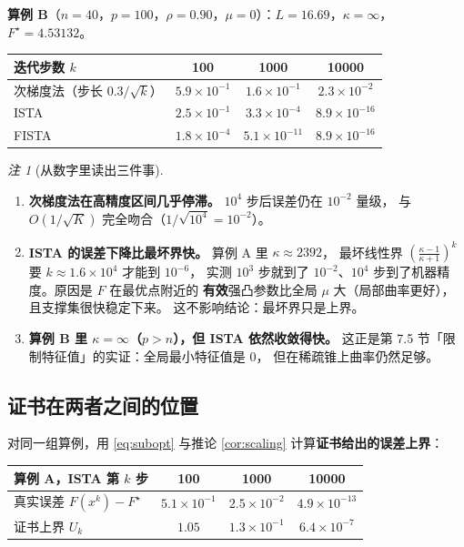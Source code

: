 \documentclass[11pt,a4paper,UTF8]{ctexart}
\theoremstyle{plain}
\theoremstyle{definition}
\theoremstyle{remark}
\newtheorem{remark}[theorem]{注}
\begin{document}
\textbf{算例 B}（$n=40$，$p=100$，$\rho=0.90$，$\mu=0$）：$L=16.69$，$\kappa=\infty$，
$F^\star=4.53132$。

\begin{center}
\small
\begin{tabular}{@{}lccc@{}}
\toprule
迭代步数 $k$ & 100 & 1000 & 10000\\
\midrule
次梯度法（步长 $0.3/\sqrt k$）& $5.9\times10^{-1}$ & $1.6\times10^{-1}$ & $2.3\times10^{-2}$\\
ISTA & $2.5\times10^{-1}$ & $3.3\times10^{-4}$ & $8.9\times10^{-16}$\\
FISTA & $1.8\times10^{-4}$ & $5.1\times10^{-11}$ & $8.9\times10^{-16}$\\
\bottomrule
\end{tabular}
\end{center}

\begin{remark}[从数字里读出三件事]
\begin{enumerate}
\item \textbf{次梯度法在高精度区间几乎停滞。} $10^4$ 步后误差仍在 $10^{-2}$ 量级，
      与 $O(1/\sqrt K)$ 完全吻合（$1/\sqrt{10^4}=10^{-2}$）。
\item \textbf{ISTA 的误差下降比最坏界快。} 算例 A 里 $\kappa\approx2392$，
      最坏线性界 $(\frac{\kappa-1}{\kappa+1})^k$ 要 $k\approx1.6\times10^4$ 才能到 $10^{-6}$，
      实测 $10^3$ 步就到了 $10^{-2}$、$10^4$ 步到了机器精度。原因是 $F$ 在最优点附近的
      \textbf{有效}强凸参数比全局 $\mu$ 大（局部曲率更好），且支撑集很快稳定下来。
      这不影响结论：最坏界只是上界。
\item \textbf{算例 B 里 $\kappa=\infty$（$p>n$），但 ISTA 依然收敛得快。}
      这正是第 7.5 节「限制特征值」的实证：全局最小特征值是 $0$，
      但在稀疏锥上曲率仍然足够。
\end{enumerate}
\end{remark}

\subsection{证书在两者之间的位置}

对同一组算例，用 \eqref{eq:subopt} 与推论 \ref{cor:scaling} 计算\textbf{证书给出的误差上界}：

\begin{center}
\small
\begin{tabular}{@{}lccc@{}}
\toprule
算例 A，ISTA 第 $k$ 步 & 100 & 1000 & 10000\\
\midrule
真实误差 $F(x^k)-F^\star$ & $5.1\times10^{-1}$ & $2.5\times10^{-2}$ & $4.9\times10^{-13}$\\
证书上界 $U_k$ & $1.05$ & $1.3\times10^{-1}$ & $6.4\times10^{-7}$\\
\bottomrule
\end{tabular}
\end{center}
\end{document}
